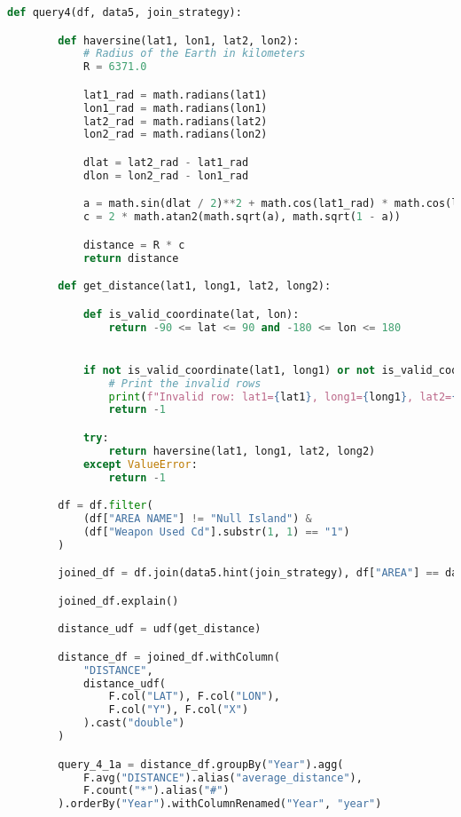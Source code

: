 \documentclass{article}
\begin{document}
\begin{lstlisting}[language = Python]
    def query4(df, data5, join_strategy):

        def haversine(lat1, lon1, lat2, lon2):
            # Radius of the Earth in kilometers
            R = 6371.0

            lat1_rad = math.radians(lat1)
            lon1_rad = math.radians(lon1)
            lat2_rad = math.radians(lat2)
            lon2_rad = math.radians(lon2)

            dlat = lat2_rad - lat1_rad
            dlon = lon2_rad - lon1_rad

            a = math.sin(dlat / 2)**2 + math.cos(lat1_rad) * math.cos(lat2_rad) * math.sin(dlon / 2)**2
            c = 2 * math.atan2(math.sqrt(a), math.sqrt(1 - a))

            distance = R * c
            return distance

        def get_distance(lat1, long1, lat2, long2):

            def is_valid_coordinate(lat, lon):
                return -90 <= lat <= 90 and -180 <= lon <= 180


            if not is_valid_coordinate(lat1, long1) or not is_valid_coordinate(lat2, long2):
                # Print the invalid rows
                print(f"Invalid row: lat1={lat1}, long1={long1}, lat2={lat2}, long2={long2}")
                return -1

            try:
                return haversine(lat1, long1, lat2, long2)
            except ValueError:
                return -1

        df = df.filter(
            (df["AREA NAME"] != "Null Island") &
            (df["Weapon Used Cd"].substr(1, 1) == "1")
        )

        joined_df = df.join(data5.hint(join_strategy), df["AREA"] == data5["PREC"])

        joined_df.explain()

        distance_udf = udf(get_distance)

        distance_df = joined_df.withColumn(
            "DISTANCE",
            distance_udf(
                F.col("LAT"), F.col("LON"),
                F.col("Y"), F.col("X")
            ).cast("double")
        )

        query_4_1a = distance_df.groupBy("Year").agg(
            F.avg("DISTANCE").alias("average_distance"),
            F.count("*").alias("#")
        ).orderBy("Year").withColumnRenamed("Year", "year")


\end{lstlisting}
\end{document}
